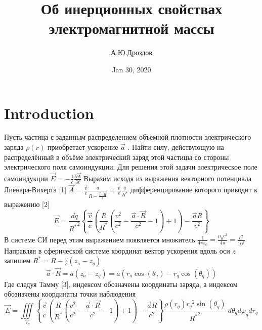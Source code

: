 ﻿\documentclass{article}
\begin{document}
\title{Об инерционных свойствах электромагнитной массы}

\author{А.Ю.Дроздов}

\date{Jan 30, 2020}



\section{Introduction}



Пусть частица с заданным распределением объёмной плотности электрического заряда $\rho \left( r \right)$ приобретает ускорение $\overrightarrow{a}$ . Найти силу, действующую на распределённый в объёме электрический заряд этой частицы со стороны электрического поля самоиндукции. 
Для решения этой задачи электрическое поле самоиндукции $\overrightarrow{E}=-\frac{1}{c}\frac{\partial \overrightarrow{A}}{\partial t}$ 
Выразим исходя из выражения векторного потенциала Лиенара-Вихерта [1] $\overrightarrow{A}=\frac{\overrightarrow{v}}{c}\frac{q}{R-\frac{\overrightarrow{v}\cdot \overrightarrow{R}}{c}}=\frac{\overrightarrow{v}}{c}\frac{q}{{{R}^{*}}}$ дифференцирование которого приводит к выражению [2]
\[\overrightarrow{E}=\frac{dq}{{{R}^{*}}^{2}}\left\{ \frac{\overrightarrow{v}}{c}\left( \frac{R}{{{R}^{*}}}\left( \frac{{{v}^{2}}}{{{c}^{2}}}-\frac{\overrightarrow{a}\cdot \overrightarrow{R}}{{{c}^{2}}}-1 \right)+1 \right)-\frac{\overrightarrow{a}R}{{{c}^{2}}} \right\}\] 
В системе СИ перед этим выражением появляется множитель $\frac{1}{4\pi {{\varepsilon }_{0}}}=\frac{{{\mu }_{0}}{{c}^{2}}}{4\pi }=\frac{{{c}^{2}}}{{{10}^{7}}}$ 
Направляя в сферической системе координат вектор ускорения вдоль оси $z$  запишем
${{R}^{*}}=R-\frac{v}{c}\left( {{z}_{a}}-{{z}_{q}} \right)$  
\[\overrightarrow{a}\cdot \overrightarrow{R}=a\left( {{z}_{a}}-{{z}_{q}} \right)=a\left( {{r}_{a}}\cos \left( {{\theta }_{a}} \right)-{{r}_{q}}\cos \left( {{\theta }_{q}} \right) \right)\]
Где следуя Тамму [3], индексом  обозначены координаты заряда, а индексом  обозначены координаты точки наблюдения
\[\overrightarrow{E}=\iiint\limits_{{{V}_{q}}}{\left\{ \frac{\overrightarrow{v}}{c}\left( \frac{R}{{{R}^{*}}}\left( \frac{{{v}^{2}}}{{{c}^{2}}}-\frac{\overrightarrow{a}\cdot \overrightarrow{R}}{{{c}^{2}}}-1 \right)+1 \right)-\frac{\overrightarrow{a}R}{{{c}^{2}}} \right\}\frac{\rho \left( {{r}_{q}} \right){{r}_{q}}^{2}\sin \left( {{\theta }_{q}} \right)}{{{R}^{*}}^{2}}\ }d{{\theta }_{q}}d{{\varphi }_{q}}d{{r}_{q}}\]
\end{document}
